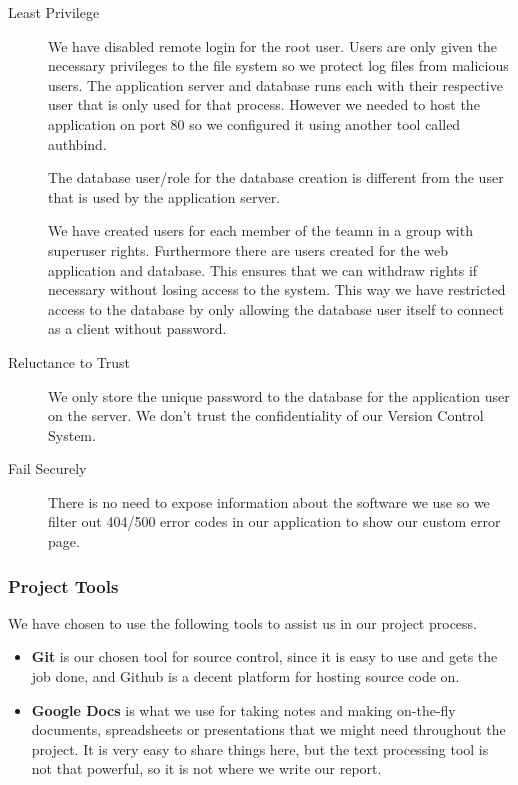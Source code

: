 \documentclass[a4paper]{article}
\begin{document}
\begin{description}
\item[Least Privilege] 

We have disabled remote login for the root user. Users are only given the necessary privileges to the file system so we protect log files from malicious users.
The application server and database runs each with their respective user that is only used for that process. However we needed to host the application on port 80 so we configured it using another tool called authbind.

The database user/role for the database creation is different from the user that is used by the application server. 

We have created users for each member of the teamn in a group with superuser rights. Furthermore there are users created for the web application and database.
This ensures that we can withdraw rights if necessary without losing access to the system.
This way we have restricted access to the database by only allowing the database user itself to connect as a client without password.

\item[Reluctance to Trust]
We only store the unique password to the database for the application user on the server. We don't trust the confidentiality of our Version Control System.

\item[Fail Securely]
There is no need to expose information about the software we use so we filter out 404/500 error codes in our application to show our custom error page.
\end{description}

\subsubsection{Project Tools}
We have chosen to use the following tools to assist us in our project process.
\begin{itemize}
\item \textbf{Git} is our chosen tool for source control, since it is easy to use and gets the job done, and Github is a decent platform for hosting source code on.
\item \textbf{Google Docs} is what we use for taking notes and making on-the-fly documents, spreadsheets or presentations that we might need throughout the project. It is very easy to share things here, but the text processing tool is not that powerful, so it is not where we write our report.
\end{itemize}
\end{document}
